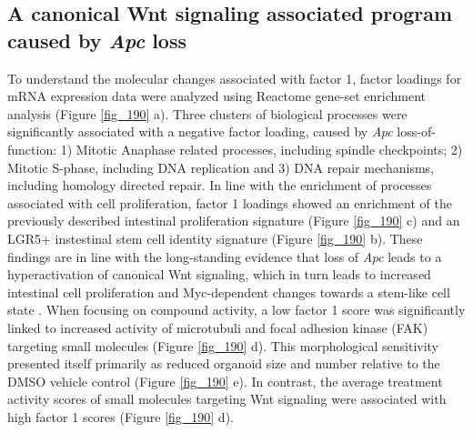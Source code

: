 \begin{flushleft}
\subsection{A canonical Wnt signaling associated program caused by \textit{Apc} loss}

To understand the molecular changes associated with factor 1, factor loadings for mRNA expression data were analyzed using Reactome gene-set enrichment analysis (Figure \ref{fig_190} a). Three clusters of biological processes were significantly associated with a negative factor loading, caused by \textit{Apc} loss-of-function: 1) Mitotic Anaphase related processes, including spindle checkpoints; 2) Mitotic S-phase, including DNA replication and 3) DNA repair mechanisms, including homology directed repair. In line with the enrichment of processes associated with cell proliferation, factor 1 loadings showed an enrichment of the previously described intestinal proliferation signature (Figure \ref{fig_190} c) and an LGR5+ instestinal stem cell identity signature (Figure \ref{fig_190} b). These findings are in line with the long-standing evidence that loss of \textit{Apc} leads to a hyperactivation of canonical Wnt signaling, which in turn leads to increased intestinal cell proliferation and Myc-dependent changes towards a stem-like cell state \citep{sansomMycDeletionRescues2007, satohGlobalMetabolicReprogramming2017}. When focusing on compound activity, a low factor 1 score was significantly linked to increased activity of microtubuli and focal adhesion kinase (FAK) targeting small molecules (Figure \ref{fig_190} d). This morphological sensitivity presented itself primarily as reduced organoid size and number relative to the DMSO vehicle control (Figure \ref{fig_190} e). In contrast, the average treatment activity scores of small molecules targeting Wnt signaling were associated with high factor 1 scores (Figure \ref{fig_190} d).  


\end{flushleft}
